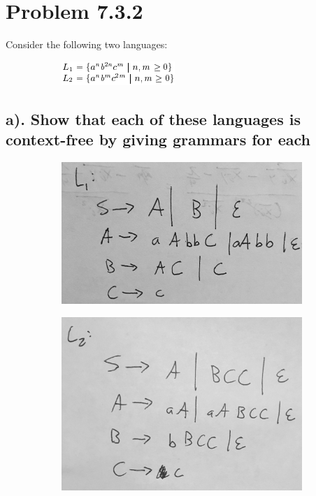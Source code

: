 \documentclass[20pt]{article} %
\begin{document}
\section{Problem 7.3.2}
Consider the following two languages:
\begin{figure}[!htbp]
  	\centering
   	\begin{subfigure}[p]{0.33\linewidth}
    	\includegraphics[width=\linewidth]{./figures/HW8fig2.png}
   	\end{subfigure}
\end{figure} 
\subsection{a). Show that each of these languages is context-free by giving grammars for each}
\begin{figure}[!htbp]
  	\centering
   	\begin{subfigure}[p]{0.4\linewidth}
    	\includegraphics[width=\linewidth]{./figures/h8-5.jpg}
   	\end{subfigure}
  	\centering
   	\begin{subfigure}[p]{0.4\linewidth}
    	\includegraphics[width=\linewidth]{./figures/h8-6.jpg}
   	\end{subfigure}
\end{figure} 
\end{document}
